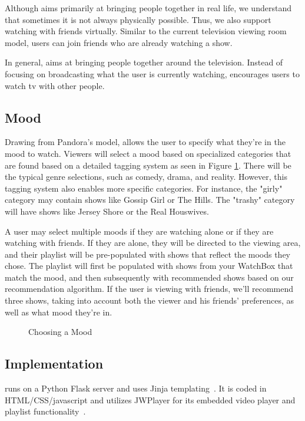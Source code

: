 Although {\sys} aims primarily at bringing people together in real
life, we understand that sometimes it is not always physically
possible.  Thus, we also support watching with friends virtually.
Similar to the current television viewing room model, users can join friends who are already watching a show.

In general, {\sys} aims at bringing people together around the
television.  Instead of focusing on broadcasting what the user is
currently watching, {\sys} encourages users to watch tv with other
people.

\subsection{Mood}
Drawing from Pandora's model, {\sys} allows the user to specify what
they're in the mood to watch.  Viewers will select a mood based on
specialized categories that are found based on a detailed tagging
system as seen in Figure \ref{fig:mood}.  There will be the typical genre selections, such as comedy,
drama, and reality.  However, this tagging system also enables more
specific categories.  For instance, the "girly" category may contain
shows like Gossip Girl or The Hills.  The "trashy" category will have
shows like Jersey Shore or the Real Houswives.

A user may select multiple moods if they are watching alone or if
they are watching with friends.  If they are alone, they will be
directed to the viewing area, and their playlist will be pre-populated
with shows that reflect the moods they chose.  The playlist will first
be populated with shows from your WatchBox that match the mood, and
then subsequently with recommended shows based on our recommendation
algorithm.  If the user is viewing with friends, we'll recommend three
shows, taking into account both the viewer and his friends' preferences, as
well as what mood they're in.

\begin{figure}
\centering
{}
\caption{Choosing a Mood}
\label{fig:mood}
\end{figure}

\subsection{Implementation}
{\sys} runs on a Python Flask server and uses Jinja
templating~\cite{flask,jinja}.  It is coded in HTML/CSS/javascript and utilizes JWPlayer
for its embedded video player and playlist functionality~\cite{jwplayer}.
